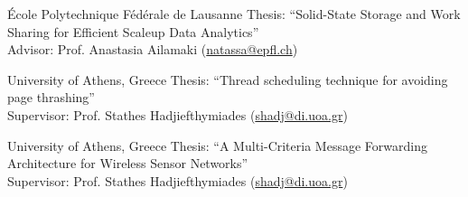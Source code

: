 
  {École Polytechnique Fédérale de Lausanne}
  {Thesis: “Solid-State Storage and Work Sharing for Efficient Scaleup Data Analytics” \\
   Advisor: Prof. Anastasia Ailamaki (\href{mailto:natassa@epfl.ch}{natassa@epfl.ch})}

  {University of Athens, Greece}
  {Thesis: “Thread scheduling technique for avoiding page thrashing” \\
   Supervisor: Prof. Stathes Hadjiefthymiades (\href{mailto:shadj@di.uoa.gr}{shadj@di.uoa.gr})}

  {University of Athens, Greece}
  {Thesis: “A Multi-Criteria Message Forwarding Architecture for Wireless Sensor Networks” \\
   Supervisor: Prof. Stathes Hadjiefthymiades (\href{mailto:shadj@di.uoa.gr}{shadj@di.uoa.gr})}
